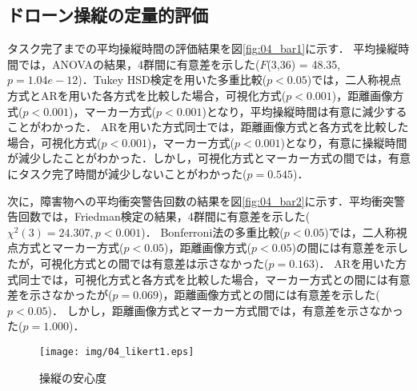 \documentclass[submit]{ipsj}
\begin{document}

\subsection{ドローン操縦の定量的評価}
\label{result_1}
タスク完了までの平均操縦時間の評価結果を図\ref{fig:04_bar1}に示す．
平均操縦時間では，ANOVAの結果，4群間に有意差を示した($F$(3,36) = 48.35, $p = 1.04e-12 $)．Tukey HSD検定を用いた多重比較($p < 0.05$)では，二人称視点方式とARを用いた各方式を比較した場合，可視化方式($p < 0.001$)，距離画像方式($p < 0.001$)，マーカー方式($p < 0.001$)となり，平均操縦時間は有意に減少することがわかった．
ARを用いた方式同士では，距離画像方式と各方式を比較した場合，可視化方式($p < 0.001$)，マーカー方式($p < 0.001$)となり，有意に操縦時間が減少したことがわかった．しかし，可視化方式とマーカー方式の間では，有意にタスク完了時間が減少しないことがわかった($p = 0.545$)．
\par
次に，障害物への平均衝突警告回数の結果を図\ref{fig:04_bar2}に示す．平均衝突警告回数では，Friedman検定の結果，4群間に有意差を示した($\chi^{2}(3)=24.307, p < 0.001$)．
Bonferroni法の多重比較($p < 0.05$)では，二人称視点方式とマーカー方式($p < 0.05$)，距離画像方式($p < 0.05$)の間には有意差を示したが，可視化方式との間では有意差は示さなかった($p = 0.163$)．
ARを用いた方式同士では，可視化方式と各方式を比較した場合，マーカー方式との間には有意差を示さなかったが($p = 0.069$)，距離画像方式との間には有意差を示した($p < 0.05$)．
しかし，距離画像方式とマーカー方式間では，有意差を示さなかった($p = 1.000$)．


\begin{figure}[tb]
  \centering
  \texttt{[image: img/04\_likert1.eps]}
  \caption{操縦の安心度}
  \label{fig:04_likert1}
  \end{figure}
  
\end{document}
